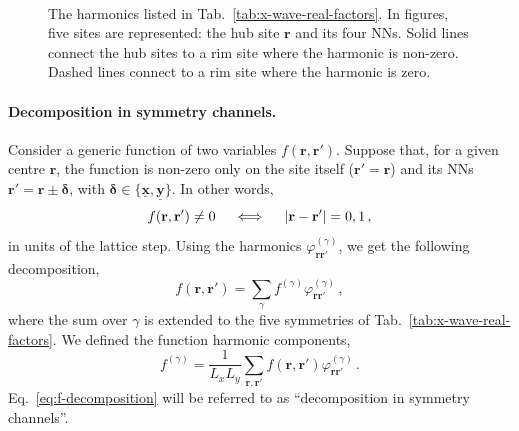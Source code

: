 \begin{figure}[t]
	\centering
	\hspace{2em}
	\\[3em]
	\hspace{2em}
	\hspace{2em}
	\caption{The harmonics listed in Tab.~\ref{tab:x-wave-real-factors}. In figures, five sites are represented: the hub site $\mathbf{r}$ and its four NNs. Solid lines connect the hub sites to a rim site where the harmonic is non-zero. Dashed lines connect to a rim site where the harmonic is zero.}
	\label{fig:x-wave-real-factors}
\end{figure}

\paragraph{Decomposition in symmetry channels.}

Consider a generic function of two variables $f(\mathbf{r},\mathbf{r}')$. Suppose that, for a given centre $\mathbf{r}$, the function is non-zero only on the site itself ($\mathbf{r}'=\mathbf{r}$) and its NNs $\mathbf{r}'=\mathbf{r}\pm\bm{\delta}$, with $\bm{\delta}\in\lbrace\underline{\mathbf{x}},\underline{\mathbf{y}}\rbrace$. In other words,
\begin{equation}\label{eq:f-NNs}
	f(\mathbf{r},\mathbf{r}') \neq 0
	\quad\iff\quad
	\abs{\mathbf{r}-\mathbf{r}'} = 0, 1 \, ,
\end{equation}
in units of the lattice step. Using the harmonics $\varphi_{\mathbf{r}\mathbf{r}'}^{(\gamma)}$, we get the following decomposition,
\begin{equation}\label{eq:f-decomposition}
	f(\mathbf{r},\mathbf{r}') = \sum_\gamma f^{(\gamma)} \varphi_{\mathbf{r}\mathbf{r}'}^{(\gamma)} \, ,
\end{equation}
where the sum over $\gamma$ is extended to the five symmetries of Tab.~\ref{tab:x-wave-real-factors}. We defined the function harmonic components,
\begin{equation}\label{eq:f-gamma}
	f^{(\gamma)} = \frac{1}{L_x L_y} \sum_{\mathbf{r},\mathbf{r}'} f(\mathbf{r},\mathbf{r}') \varphi_{\mathbf{r}\mathbf{r}'}^{(\gamma)} \, .
\end{equation}
Eq.~\eqref{eq:f-decomposition} will be referred to as ``decomposition in symmetry channels''.

